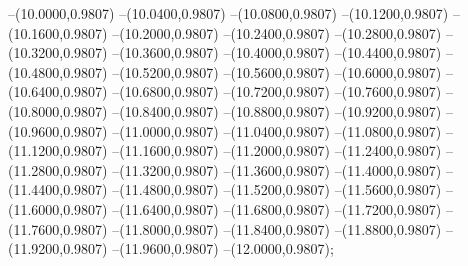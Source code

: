 {	--(10.0000,0.9807)
	--(10.0400,0.9807)
	--(10.0800,0.9807)
	--(10.1200,0.9807)
	--(10.1600,0.9807)
	--(10.2000,0.9807)
	--(10.2400,0.9807)
	--(10.2800,0.9807)
	--(10.3200,0.9807)
	--(10.3600,0.9807)
	--(10.4000,0.9807)
	--(10.4400,0.9807)
	--(10.4800,0.9807)
	--(10.5200,0.9807)
	--(10.5600,0.9807)
	--(10.6000,0.9807)
	--(10.6400,0.9807)
	--(10.6800,0.9807)
	--(10.7200,0.9807)
	--(10.7600,0.9807)
	--(10.8000,0.9807)
	--(10.8400,0.9807)
	--(10.8800,0.9807)
	--(10.9200,0.9807)
	--(10.9600,0.9807)
	--(11.0000,0.9807)
	--(11.0400,0.9807)
	--(11.0800,0.9807)
	--(11.1200,0.9807)
	--(11.1600,0.9807)
	--(11.2000,0.9807)
	--(11.2400,0.9807)
	--(11.2800,0.9807)
	--(11.3200,0.9807)
	--(11.3600,0.9807)
	--(11.4000,0.9807)
	--(11.4400,0.9807)
	--(11.4800,0.9807)
	--(11.5200,0.9807)
	--(11.5600,0.9807)
	--(11.6000,0.9807)
	--(11.6400,0.9807)
	--(11.6800,0.9807)
	--(11.7200,0.9807)
	--(11.7600,0.9807)
	--(11.8000,0.9807)
	--(11.8400,0.9807)
	--(11.8800,0.9807)
	--(11.9200,0.9807)
	--(11.9600,0.9807)
	--(12.0000,0.9807);
}
